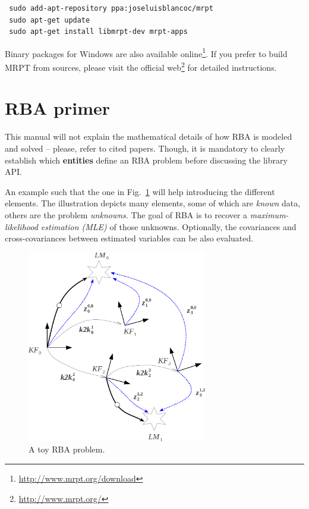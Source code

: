\documentclass[a4paper,11pt]{article}
\begin{document}
\begin{lstlisting}
 sudo add-apt-repository ppa:joseluisblancoc/mrpt
 sudo apt-get update
 sudo apt-get install libmrpt-dev mrpt-apps
\end{lstlisting}

Binary packages for Windows are also available online\footnote{\href{http://www.mrpt.org/download}{http://www.mrpt.org/download}}.
If you prefer to build MRPT from sources, please visit the official web\footnote{\href{http://www.mrpt.org/}{http://www.mrpt.org/}} 
for detailed instructions.


\section{RBA primer}
\label{sect:rba_primer}

This manual will not explain the mathematical details of how RBA is modeled and solved -- please, refer to cited papers.
Though, it is mandatory to clearly establish which \textbf{entities} define an RBA problem before discussing the library API.

An example such that the one in Fig.~\ref{fig:rba.entities} will help introducing the different elements.
The illustration depicts many elements, some of which are \emph{known} data, others are the problem \emph{unknowns}. 
The goal of RBA is to recover a \emph{maximum-likelihood estimation (MLE)} of those unknowns. Optionally, the covariances and 
cross-covariances between estimated variables can be also evaluated.

\begin{figure}
\centering
\includegraphics[width=0.7\textwidth]{imgs/srba_toy_problem.pdf} 
\caption{A toy RBA problem.}
\label{fig:rba.entities}
\end{figure}
\end{document}
